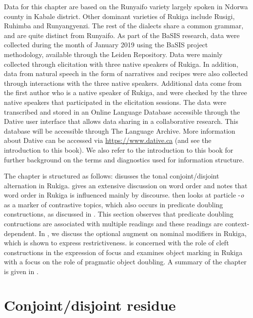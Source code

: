 \documentclass[output=paper]{langscibook}
\begin{document}
Data for this chapter are based on the Runyaifo variety largely spoken in Ndorwa county in Kabale district. Other dominant varieties of Rukiga include Rusigi, Ruhimba and Runyangyenzi. The rest of the dialects share a common grammar, and are quite distinct from Runyaifo. As part of the BaSIS research, data were collected during the month of January 2019 using the BaSIS project methodology, available through the Leiden Repository. Data were mainly collected through elicitation with three native speakers of Rukiga. In addition, data from natural speech in the form of narratives and recipes were also collected through interactions with the three native speakers. Additional data come from the first author who is a native speaker of Rukiga, and were checked by the three native speakers that participated in the elicitation sessions. The data were transcribed and stored in an Online Language Database accessible through the Dative user interface that allows data sharing in a collaborative research. This database will be accessible through The Language Archive. More information about Dative can be accessed via \url{https://www.dative.ca} (and see the introduction to this book). We also refer to the introduction to this book for further background on the terms and diagnostics used for information structure.

The chapter is structured as follows:  disusses the tonal conjoint\slash disjoint alternation in Rukiga.  gives an extensive discussion on word order and notes that word order in Rukiga is influenced mainly by discourse.  then looks at particle \mbox{-\textit{o}} as a marker of contrastive topics, which also occurs in  predicate doubling constructions, as discussed in . This section observes that predicate doubling contructions are associated with multiple readings and these readings are context-dependent. In , we discuss the optional augment on nominal modifiers in Rukiga, which is shown to express restrictiveness.  is concerned with the role of cleft constructions in the expression of focus and  examines object marking in Rukiga with a focus on the role of pragmatic object doubling. A summary of the chapter is given in .

\section{Conjoint/disjoint residue}\label{sec:cjdj-residue}
\end{document}
